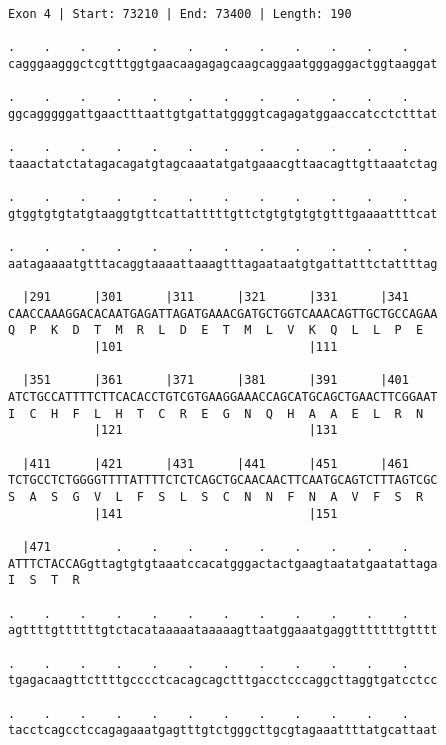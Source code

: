 \documentclass{article}
\begin{document}
\begin{Verbatim}[fontfamily=courier]
Exon 4 | Start: 73210 | End: 73400 | Length: 190

.    .    .    .    .    .    .    .    .    .    .    .    
cagggaagggctcgtttggtgaacaagagagcaagcaggaatgggaggactggtaaggat

.    .    .    .    .    .    .    .    .    .    .    .    
ggcagggggattgaactttaattgtgattatggggtcagagatggaaccatcctctttat

.    .    .    .    .    .    .    .    .    .    .    .    
taaactatctatagacagatgtagcaaatatgatgaaacgttaacagttgttaaatctag

.    .    .    .    .    .    .    .    .    .    .    .    
gtggtgtgtatgtaaggtgttcattatttttgttctgtgtgtgtgtttgaaaattttcat

.    .    .    .    .    .    .    .    .    .    .    .    
aatagaaaatgtttacaggtaaaattaaagtttagaataatgtgattatttctattttag

  |291      |301      |311      |321      |331      |341    
CAACCAAAGGACACAATGAGATTAGATGAAACGATGCTGGTCAAACAGTTGCTGCCAGAA
Q  P  K  D  T  M  R  L  D  E  T  M  L  V  K  Q  L  L  P  E  
            |101                          |111              

  |351      |361      |371      |381      |391      |401    
ATCTGCCATTTTCTTCACACCTGTCGTGAAGGAAACCAGCATGCAGCTGAACTTCGGAAT
I  C  H  F  L  H  T  C  R  E  G  N  Q  H  A  A  E  L  R  N  
            |121                          |131              

  |411      |421      |431      |441      |451      |461    
TCTGCCTCTGGGGTTTTATTTTCTCTCAGCTGCAACAACTTCAATGCAGTCTTTAGTCGC
S  A  S  G  V  L  F  S  L  S  C  N  N  F  N  A  V  F  S  R  
            |141                          |151              

  |471         .    .    .    .    .    .    .    .    .    
ATTTCTACCAGgttagtgtgtaaatccacatgggactactgaagtaatatgaatattaga
I  S  T  R                                                  

.    .    .    .    .    .    .    .    .    .    .    .    
agttttgttttttgtctacataaaaataaaaagttaatggaaatgaggtttttttgtttt

.    .    .    .    .    .    .    .    .    .    .    .    
tgagacaagttcttttgcccctcacagcagctttgacctcccaggcttaggtgatcctcc

.    .    .    .    .    .    .    .    .    .    .    .    
tacctcagcctccagagaaatgagtttgtctgggcttgcgtagaaattttatgcattaat

\end{Verbatim}
\end{document}
